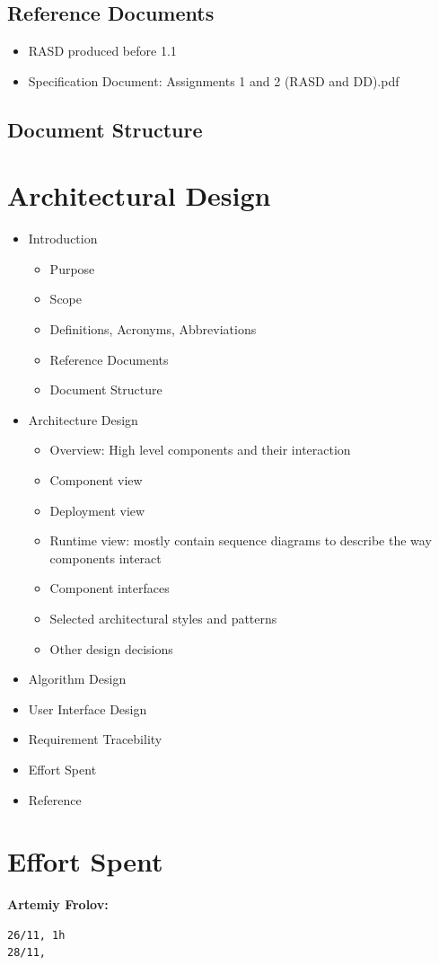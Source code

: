 \documentclass[12pt, letterpaper]{article}
\begin{document}
\subsection{Reference Documents} 

\begin{itemize}
	\item RASD produced before 1.1
	\item Specification Document: Assignments 1 and 2 (RASD and DD).pdf
\end{itemize}

\subsection{Document Structure}

\newpage
\section{Architectural Design} 

\begin{itemize}
\item Introduction
	\begin{itemize}
		\item Purpose 
		\item Scope
		\item Definitions, Acronyms, Abbreviations
		\item Reference Documents
		\item Document Structure 
	\end{itemize}
\item Architecture Design
	\begin{itemize}
		\item Overview:	High level components and their interaction
		\item Component view
		\item Deployment view
		\item Runtime view: mostly contain sequence diagrams to describe the way components interact
		\item Component	interfaces
		\item Selected architectural styles and	patterns 
		\item Other	design decisions
	\end{itemize}
\item Algorithm Design
\item User Interface Design
\item Requirement Tracebility
\item Effort Spent
\item Reference

\end{itemize}









\section {Effort Spent} 
\textbf{Artemiy Frolov:}
\begin{verbatim}
26/11, 1h
28/11,
\end{verbatim} 

\newpage
\end{document}

